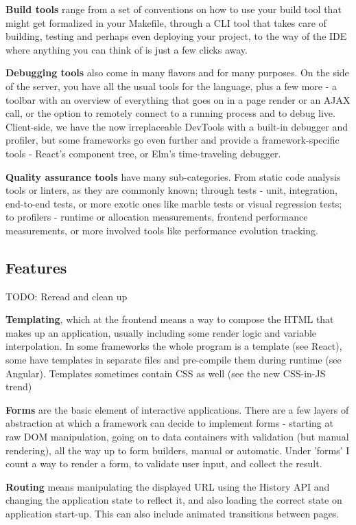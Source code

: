 \documentclass[english,odsaz]{fitthesis}
\begin{document}
\textbf{Build tools} range from a set of conventions on how to use your build tool that
might get formalized in your Makefile, through a CLI tool that takes care of
building, testing and perhaps even deploying your project, to the way of the IDE
where anything you can think of is just a few clicks away.

\textbf{Debugging tools} also come in many flavors and for many purposes. On the side of
the server, you have all the usual tools for the language, plus a few more - a
toolbar with an overview of everything that goes on in a page render or an AJAX
call, or the option to remotely connect to a running process and to debug
live. Client-side, we have the now irreplaceable DevTools with a built-in
debugger and profiler, but some frameworks go even further and provide a
framework-specific tools - React's component tree, or Elm's time-traveling
debugger.

\textbf{Quality assurance tools} have many sub-categories. From static code analysis
tools or linters, as they are commonly known; through tests - unit, integration,
end-to-end tests, or more exotic ones like marble tests or visual regression
tests; to profilers - runtime or allocation measurements, frontend performance
measurements, or more involved tools like performance evolution tracking.

\subsection{Features}
\label{sec:org51ab80a}
TODO: Reread and clean up

\textbf{Templating}, which at the frontend means a way to compose the HTML that makes up
an application, usually including some render logic and variable
interpolation. In some frameworks the whole program is a template (see React),
some have templates in separate files and pre-compile them during runtime (see
Angular). Templates sometimes contain CSS as well (see the new CSS-in-JS trend)

\textbf{Forms} are the basic element of interactive applications. There are a few layers
of abstraction at which a framework can decide to implement forms - starting at
raw DOM manipulation, going on to data containers with validation (but manual
rendering), all the way up to form builders, manual or automatic. Under 'forms'
I count a way to render a form, to validate user input, and collect the result.

\textbf{Routing} means manipulating the displayed URL using the History API and changing
the application state to reflect it, and also loading the correct state on
application start-up. This can also include animated transitions between pages.
\end{document}
